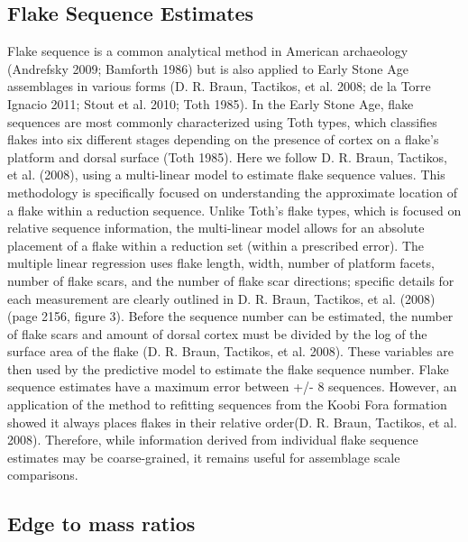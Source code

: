\documentclass[]{elsarticle} %
\begin{document}
\hypertarget{flake-sequence-estimates}{%
\subsection{Flake Sequence Estimates}\label{flake-sequence-estimates}}

Flake sequence is a common analytical method in American archaeology
(Andrefsky 2009; Bamforth 1986) but is also applied to Early Stone Age
assemblages in various forms (D. R. Braun, Tactikos, et al. 2008; de la
Torre Ignacio 2011; Stout et al. 2010; Toth 1985). In the Early Stone
Age, flake sequences are most commonly characterized using Toth types,
which classifies flakes into six different stages depending on the
presence of cortex on a flake's platform and dorsal surface (Toth 1985).
Here we follow D. R. Braun, Tactikos, et al. (2008), using a
multi-linear model to estimate flake sequence values. This methodology
is specifically focused on understanding the approximate location of a
flake within a reduction sequence. Unlike Toth's flake types, which is
focused on relative sequence information, the multi-linear model allows
for an absolute placement of a flake within a reduction set (within a
prescribed error). The multiple linear regression uses flake length,
width, number of platform facets, number of flake scars, and the number
of flake scar directions; specific details for each measurement are
clearly outlined in D. R. Braun, Tactikos, et al. (2008) (page 2156,
figure 3). Before the sequence number can be estimated, the number of
flake scars and amount of dorsal cortex must be divided by the log of
the surface area of the flake (D. R. Braun, Tactikos, et al. 2008).
These variables are then used by the predictive model to estimate the
flake sequence number. Flake sequence estimates have a maximum error
between +/- 8 sequences. However, an application of the method to
refitting sequences from the Koobi Fora formation showed it always
places flakes in their relative order(D. R. Braun, Tactikos, et al.
2008). Therefore, while information derived from individual flake
sequence estimates may be coarse-grained, it remains useful for
assemblage scale comparisons.

\hypertarget{edge-to-mass-ratios}{%
\subsection{Edge to mass ratios}\label{edge-to-mass-ratios}}
\end{document}

